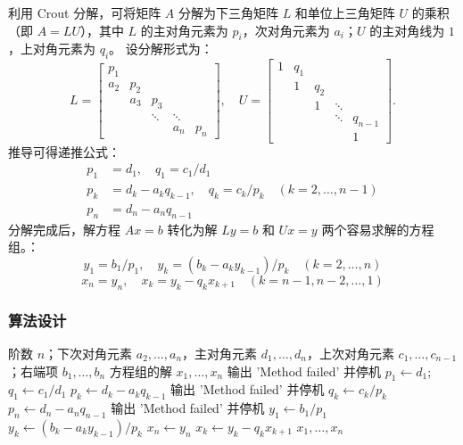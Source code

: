 \documentclass{article}
\begin{document}
利用 Crout 分解，可将矩阵 $A$ 分解为下三角矩阵 $L$ 和单位上三角矩阵 $U$ 的乘积（即 $A=LU$），其中 $L$ 的主对角元素为 $p_i$，次对角元素为 $a_i$；$U$ 的主对角线为 $1$，上对角元素为 $q_i$。
设分解形式为：
\[
L = \begin{bmatrix}
p_1 & & & \\
a_2 & p_2 & & \\
& a_3 & p_3 & \\
& & \ddots & \ddots \\
& & & a_n & p_n
\end{bmatrix},\quad
U = \begin{bmatrix}
1 & q_1 & & \\
& 1 & q_2 & \\
& & 1 & \ddots \\
& & & \ddots & q_{n-1} \\
& & & & 1
\end{bmatrix}.
\]
推导可得递推公式：
\begin{align}
    p_1 &= d_1, \quad q_1 = c_1 / d_1 \\
    p_k &= d_k - a_k q_{k-1}, \quad q_k = c_k / p_k \quad (k=2,\dots,n-1) \\
    p_n &= d_n - a_n q_{n-1}
\end{align}
分解完成后，解方程 $Ax = b$ 转化为解 $Ly = b$ 和 $Ux = y$ 两个容易求解的方程组。：
\begin{equation}
    y_1 = b_1 / p_1, \quad y_k = (b_k - a_k y_{k-1}) / p_k \quad (k=2,\dots,n)
\end{equation}
\begin{equation}
    x_n = y_n, \quad x_k = y_k - q_k x_{k+1} \quad (k=n-1, n-2, \dots, 1)
\end{equation}

\subsubsection{算法设计}
\begin{algorithm}[H]
\caption{追赶法解三对角线性方程组}
\begin{algorithmic}[1]
    \REQUIRE 阶数 $n$；下次对角元素 $a_2,\dots,a_n$，主对角元素 $d_1,\dots,d_n$，上次对角元素 $c_1,\dots,c_{n-1}$；右端项 $b_1,\dots,b_n$
    \ENSURE 方程组的解 $x_1,\dots,x_n$
        \STATE 输出 'Method failed' 并停机
    \ENDIF
    \STATE $p_1 \leftarrow d_1$; \quad $q_1 \leftarrow c_1 / d_1$
        \STATE $p_k \leftarrow d_k - a_k q_{k-1}$
            \STATE 输出 'Method failed' 并停机
        \ENDIF
        \STATE $q_k \leftarrow c_k / p_k$
    \ENDFOR
    \STATE $p_n \leftarrow d_n - a_n q_{n-1}$
        \STATE 输出 'Method failed' 并停机
    \ENDIF
    \STATE $y_1 \leftarrow b_1 / p_1$
        \STATE $y_k \leftarrow (b_k - a_k y_{k-1}) / p_k$
    \ENDFOR
    \STATE $x_n \leftarrow y_n$
        \STATE $x_k \leftarrow y_k - q_k x_{k+1}$
    \ENDFOR
    \RETURN $x_1, \dots, x_n$
\end{algorithmic}
\end{algorithm}
\end{document}
